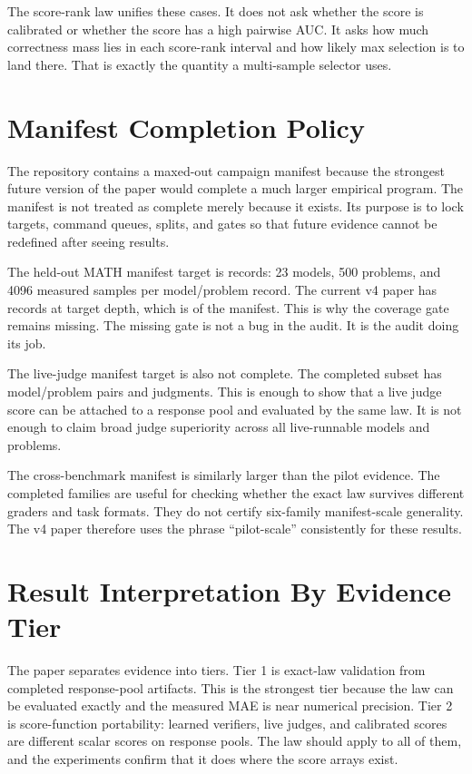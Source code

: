 The score-rank law unifies these cases. It does not ask whether the score is
calibrated or whether the score has a high pairwise AUC. It asks how much
correctness mass lies in each score-rank interval and how likely max selection
is to land there. That is exactly the quantity a multi-sample selector uses.

\section{Manifest Completion Policy}
\label{app:manifest-policy}

The repository contains a maxed-out campaign manifest because the strongest
future version of the paper would complete a much larger empirical program.
The manifest is not treated as complete merely because it exists. Its purpose
is to lock targets, command queues, splits, and gates so that future evidence
cannot be redefined after seeing results.

The held-out MATH manifest target is \EvidenceHeldoutRequiredRecords{} records:
23 models, 500 problems, and 4096 measured samples per model/problem record.
The current v4 paper has \EvidenceHeldoutRecords{} records at target depth,
which is \EvidenceHeldoutCoveragePct{} of the manifest. This is why the
coverage gate remains missing. The missing gate is not a bug in the audit. It
is the audit doing its job.

The live-judge manifest target is also not complete. The completed subset has
\EvidenceLiveJudgePairs{} model/problem pairs and \EvidenceLiveJudgeJudgments{}
judgments. This is enough to show that a live judge score can be attached to a
response pool and evaluated by the same law. It is not enough to claim broad
judge superiority across all live-runnable models and problems.

The cross-benchmark manifest is similarly larger than the pilot evidence. The
completed families are useful for checking whether the exact law survives
different graders and task formats. They do not certify six-family
manifest-scale generality. The v4 paper therefore uses the phrase
``pilot-scale'' consistently for these results.

\section{Result Interpretation By Evidence Tier}
\label{app:evidence-tier}

The paper separates evidence into tiers. Tier 1 is exact-law validation from
completed response-pool artifacts. This is the strongest tier because the law
can be evaluated exactly and the measured MAE is near numerical precision.
Tier 2 is score-function portability: learned verifiers, live judges, and
calibrated scores are different scalar scores on response pools. The law
should apply to all of them, and the experiments confirm that it does where
the score arrays exist.


